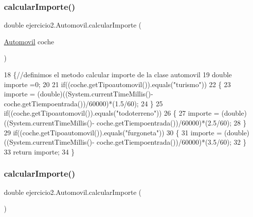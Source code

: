 \subsubsection{\texorpdfstring{calcular\+Importe()}{calcularImporte()}\hspace{0.1cm}{\footnotesize\ttfamily [1/2]}}
{\footnotesize\ttfamily double ejercicio2.\+Automovil.\+calcular\+Importe (\begin{DoxyParamCaption}\item[{\mbox{\hyperlink{classejercicio2_1_1_automovil}{Automovil}}}]{coche }\end{DoxyParamCaption})\hspace{0.3cm}{\ttfamily [inline]}}


\begin{DoxyCode}
18                                                   \{\textcolor{comment}{//definimos el metodo calcular importe de la clase
       automovil}
19         \textcolor{keywordtype}{double} importe =0;
20         
21         \textcolor{keywordflow}{if}((coche.getTipoautomovil()).equals(\textcolor{stringliteral}{"turismo"}))
22         \{
23             importe = (double)((System.currentTimeMillis()- coche.getTiempoentrada())/60000)*(1.5/60);
24         \}
25         \textcolor{keywordflow}{if}((coche.getTipoautomovil()).equals(\textcolor{stringliteral}{"todoterreno"}))
26         \{
27             importe = (double)((System.currentTimeMillis()- coche.getTiempoentrada())/60000)*(2.5/60);
28         \}
29         \textcolor{keywordflow}{if}((coche.getTipoautomovil()).equals(\textcolor{stringliteral}{"furgoneta"}))
30         \{
31             importe = (double)((System.currentTimeMillis()- coche.getTiempoentrada())/60000)*(3.5/60);
32         \}
33         \textcolor{keywordflow}{return} importe;
34     \}
\end{DoxyCode}
\mbox{\label{classejercicio2_1_1_automovil_a41eb8a2004ff16ca01df4dab14dad9b0}} 
\subsubsection{\texorpdfstring{calcular\+Importe()}{calcularImporte()}\hspace{0.1cm}{\footnotesize\ttfamily [2/2]}}
{\footnotesize\ttfamily double ejercicio2.\+Automovil.\+calcular\+Importe (\begin{DoxyParamCaption}{ }\end{DoxyParamCaption})\hspace{0.3cm}{\ttfamily [inline]}}


